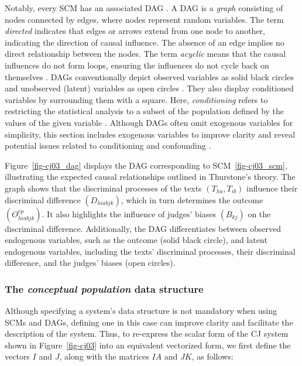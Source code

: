 \documentclass[
  authoryear,
  review,
  1p]{elsarticle}
\begin{document}
Notably, every SCM has an associated DAG
\citep{Pearl_et_al_2016, Cinelli_et_al_2020}. A DAG is a \emph{graph}
consisting of nodes connected by edges, where nodes represent random
variables. The term \emph{directed} indicates that edges or arrows
extend from one node to another, indicating the direction of causal
influence. The absence of an edge implies no direct relationship between
the nodes. The term \emph{acyclic} means that the causal influences do
not form loops, ensuring the influences do not cycle back on themselves
\citep{McElreath_2020}. DAGs conventionally depict observed variables as
solid black circles and unobserved (latent) variables as open circles
\citep{Morgan_et_al_2014}. They also display conditioned variables by
surrounding them with a square. Here, \emph{conditioning} refers to
restricting the statistical analysis to a subset of the population
defined by the values of the given variable \citep[pp.~32]{Neal_2020}.
Although DAGs often omit exogenous variables for simplicity, this
section includes exogenous variables to improve clarity and reveal
potential issues related to conditioning and confounding
\citep{Cinelli_et_al_2020}.

Figure~\ref{fig-cj03_dag} displays the DAG corresponding to
SCM~\ref{fig-cj03_scm}, illustrating the expected causal relationships
outlined in Thurstone's theory. The graph shows that the discriminal
processes of the texts \((T_{ha}, T_{ib})\) influence their discriminal
difference \((D_{hiabjk})\), which in turn determines the outcome
\((O^{cp}_{hiabjk})\). It also highlights the influence of judges'
biases \((B_{kj})\) on the discriminal difference. Additionally, the DAG
differentiates between observed endogenous variables, such as the
outcome (solid black circle), and latent endogenous variables, including
the texts' discriminal processes, their discriminal difference, and the
judges' biases (open circles).

\subsubsection{\texorpdfstring{The \emph{conceptual population} data
structure}{The conceptual population data structure}}\label{sec-theory-theoretical_P2}

Although specifying a system's data structure is not mandatory when
using SCMs and DAGs, defining one in this case can improve clarity and
facilitate the description of the system. Thus, to re-express the scalar
form of the CJ system shown in Figure~\ref{fig-cj03} into an equivalent
vectorized form, we first define the vectors \(I\) and \(J\), along with
the matrices \(IA\) and \(JK\), as follows:
\end{document}
